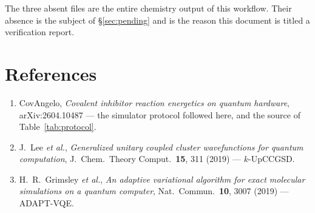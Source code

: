 \documentclass[11pt,a4paper]{article}
\begin{document}
The three absent files are the entire chemistry output of this workflow. Their
absence is the subject of \S\ref{sec:pending} and is the reason this document is
titled a verification report.

\section*{References}
\small
\begin{enumerate}[leftmargin=1.4em,itemsep=0.1em]
\item CovAngelo, \emph{Covalent inhibitor reaction energetics on quantum
  hardware}, arXiv:2604.10487 --- the simulator protocol followed here, and the
  source of Table~\ref{tab:protocol}.
\item J.\ Lee \emph{et al.}, \emph{Generalized unitary coupled cluster
  wavefunctions for quantum computation}, J.\ Chem.\ Theory Comput.\ \textbf{15},
  311 (2019) --- $k$-UpCCGSD.
\item H.\ R.\ Grimsley \emph{et al.}, \emph{An adaptive variational algorithm
  for exact molecular simulations on a quantum computer}, Nat.\ Commun.\
  \textbf{10}, 3007 (2019) --- ADAPT-VQE.
\end{enumerate}
\end{document}
